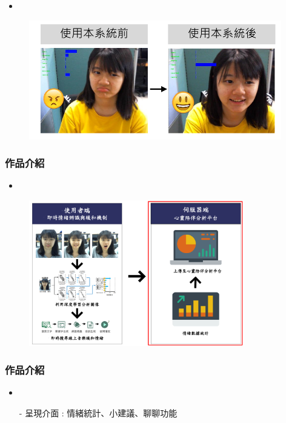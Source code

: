 \documentclass[10pt, conference, compsocconf]{beamer}
\begin{document}
\begin{CJK}{UTF8}{}
\begin{frame}
\begin{itemize}
\item {}
\end{itemize}

\begin{figure}[!t]
\begin{center}
\includegraphics[width=11cm]{./Figures/result.pdf}
\end{center}
\end{figure}
\end{frame}

\begin{frame}
\frametitle{作品介紹}
\begin{itemize}
\item {}
\end{itemize}

\begin{figure}[!t]
\begin{center}
\includegraphics[width=9.4cm]{./Figures/UserAndServer2.pdf}
\end{center}
\end{figure}

\end{frame}

\begin{frame}
\frametitle{作品介紹}
\begin{itemize}
\item {}
\end{itemize}
\begin{itemize}
\item[-]  呈現介面 : 情緒統計、小建議、聊聊功能\\
\end{itemize}
\vspace{-3mm}


\end{frame}
\end{CJK}
\end{document}
